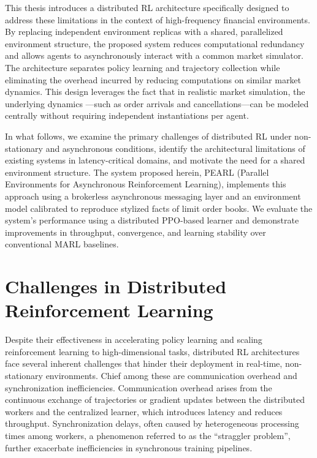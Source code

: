 This thesis introduces a distributed RL architecture specifically designed to address these limitations in the context of high-frequency financial environments.
By replacing independent environment replicas with a shared, parallelized environment structure,
the proposed system reduces computational redundancy and allows agents to asynchronously interact with a common market simulator.
The architecture separates policy learning and trajectory collection while eliminating the overhead incurred by reducing computations on similar market dynamics.
This design leverages the fact that in realistic market simulation, the underlying dynamics
---such as order arrivals and cancellations---can be modeled centrally without requiring independent instantiations per agent.

In what follows, we examine the primary challenges of distributed RL under non-stationary and asynchronous conditions,
identify the architectural limitations of existing systems in latency-critical domains, and motivate the need for a shared environment structure.
The system proposed herein, PEARL (Parallel Environments for Asynchronous Reinforcement Learning),
implements this approach using a brokerless asynchronous messaging layer and an environment model calibrated to reproduce stylized facts of limit order books.
We evaluate the system’s performance using a distributed PPO-based learner and demonstrate improvements in
throughput, convergence, and learning stability over conventional MARL baselines.

\section{Challenges in Distributed Reinforcement Learning}
\label{sec:challenges}

Despite their effectiveness in accelerating policy learning and scaling reinforcement learning to high-dimensional tasks,
distributed RL architectures face several inherent challenges that hinder their deployment in real-time, non-stationary environments.
Chief among these are communication overhead and synchronization inefficiencies.
Communication overhead arises from the continuous exchange of trajectories or gradient updates between the distributed workers and the centralized learner,
which introduces latency and reduces throughput.
Synchronization delays, often caused by heterogeneous processing times among workers, a phenomenon referred to as the ``straggler problem'',
further exacerbate inefficiencies in synchronous training pipelines.

